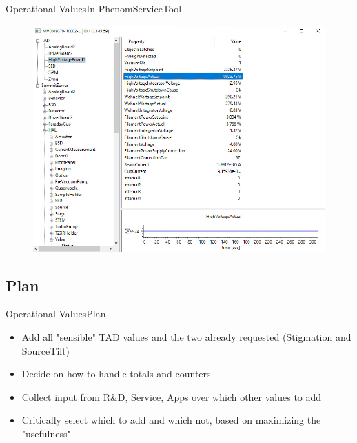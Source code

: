\documentclass[t, 9pt, aspectratio=169]{beamer}
\begin{document}
    \begin{frame}{Operational Values}{In PhenomServiceTool}
        \vspace*{-1cm}
        \begin{figure}
            \hspace*{0.5cm}\includegraphics[scale=0.47]{tad-accessors-service-tool.jpg}
        \end{figure}
    \end{frame}

    \subsection{Plan}

    \begin{frame}{Operational Values}{Plan}
        \begin{itemize}
            \item Add all "sensible" TAD values and the two already requested (Stigmation and SourceTilt)
            \item Decide on how to handle totals and counters
            \item Collect input from R\&D, Service, Apps over which other values to add
            \item Critically select which to add and which not, based on maximizing the "usefulness"
        \end{itemize}
    \end{frame}
\end{document}
